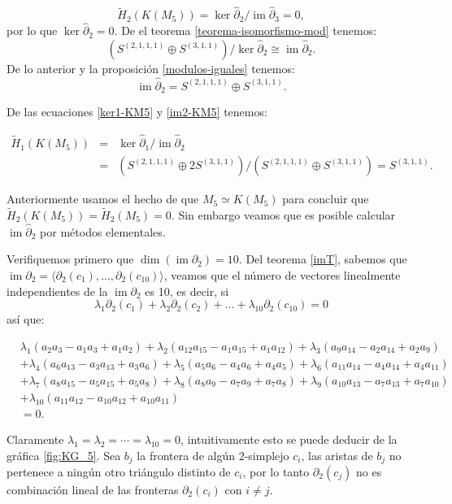 \documentclass[12pt]{book}
\theoremstyle{definition}
\DeclareMathOperator{\im}{im}
\newcounter{in}
\begin{document}
\begin{equation*}
\widetilde H_{2}(K(M_{5}))=\ker \widehat\partial_{2}/\im \widehat\partial_{3}=0,
\end{equation*}
por lo que $\ker \widehat\partial_{2}=0$. De el teorema
\ref{teorema-isomorfismo-mod} tenemos:
$$(S^{(2,1,1,1)}\oplus S^{(3,1,1)})/\ker \widehat\partial_{2}\cong \im
\widehat\partial_{2}.$$
De lo anterior y la proposición \ref{modulos-iguales} tenemos:
\begin{equation}
  \im \widehat\partial_{2}=S^{(2,1,1,1)}\oplus S^{(3,1,1)}.
  \label{im2-KM5}
\end{equation}

De las ecuaciones \ref{ker1-KM5} y \ref{im2-KM5} tenemos:

\begin{eqnarray*}
  \widetilde H_{1}(K(M_{5}))&=&\ker \widehat\partial_{1}/\im
  \widehat\partial_{2}\\
  &=&(S^{(2,1,1,1)}\oplus 2S^{(3,1,1)})/(S^{(2,1,1,1)}\oplus S^{(3,1,1)})=S^{(3,1,1)}.
\end{eqnarray*}

Anteriormente usamos el hecho de que $M_{5}\simeq K(M_{5})$  para
concluir que $\widetilde H_{2}(K(M_{5}))=\widetilde
H_{2}(M_{5})=0$. Sin embargo veamos que 
es posible calcular $\im \widehat\partial_{2}$ por métodos elementales.

Verifiquemos primero que $\dim(\im \partial_{2})=10$. Del teorema
\ref{imT}, sabemos que
$\im \partial_{2}=\langle\partial_{2}(c_{1}),\ldots,\partial_{2}(c_{10})\rangle$,
veamos que el número de vectores linealmente independientes de la
$\im \partial_{2}$ es 10, es
decir, si
$$\lambda_{1}\partial_{2}(c_{1})+\lambda_{2}\partial_{2}(c_{2})+\ldots+\lambda_{10}\partial_{2}(c_{10})=0$$
así que:

\begin{footnotesize}
  \begin{align*}
    &\lambda_{1}(a_{2}a_{3}-a_{1}a_{3}+a_{1}a_{2})+\lambda_{2}(a_{12}a_{15}-a_{1}a_{15}+a_{1}a_{12})+\lambda_{3}(a_{9}a_{14}-a_{2}a_{14}+a_{2}a_{9})\\
    &+\lambda_{4}(a_{6}a_{13}-a_{3}a_{13}+a_{3}a_{6})+\lambda_{5}(a_{5}a_{6}-a_{4}a_{6}+a_{4}a_{5})+\lambda_{6}(a_{11}a_{14}-a_{4}a_{14}+a_{4}a_{11})\\
    &+\lambda_{7}(a_{8}a_{15}-a_{5}a_{15}+a_{5}a_{8})+\lambda_{8}(a_{8}a_{9}-a_{7}a_{9}+a_{7}a_{8})+\lambda_{9}(a_{10}a_{13}-a_{7}a_{13}+a_{7}a_{10})\\
    &+\lambda_{10}(a_{11}a_{12}-a_{10}a_{12}+a_{10}a_{11})\\
    &=0.
  \end{align*}
\end{footnotesize}
Claramente $\lambda_{1}=\lambda_{2}=\cdots=\lambda_{10}=0$,
intuitivamente esto se puede deducir de la gráfica \ref{fig:KG_5}.
Sea $b_{j}$ la frontera de algún $2$-simplejo $c_{i}$, las aristas
de $b_{j}$ no pertenece a ningún otro triángulo distinto de $c_{i}$, por
lo tanto $\partial_{2}(c_{j})$ no es combinación lineal de las fronteras
$\partial_{2}(c_{i})$ con $i\neq j$.
\end{document}
